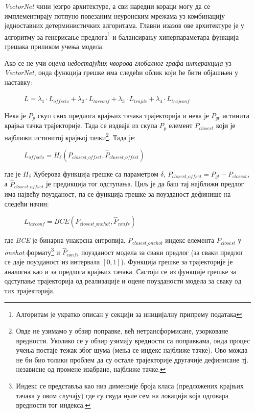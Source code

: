 \documentclass[11pt,oneside]{memoir}
\begin{document}
\textit{VectorNet} чини језгро архитектуре, а сви наредни кораци могу да се имплементирају потпуно повезаним неуронским мрежама уз комбинацију
једноставних детерминистичких алгоритама. Главни изазов ове архитектуре је у алгоритму за генерисање 
предлога\footnote{Алгоритам је укратко описан у секцији за иницијалну припрему података} и балансирању
хиперпараметара функција грешака приликом учења модела.

Ако се не учи \textit{оцена недостајућих чворова глобалног графа интеракција} уз \textit{VectorNet},
онда функција грешке има следећи облик који ће бити објашњен у наставку:

\begin{figure}[H]
  \centering
  $L = \lambda_{1} \cdot L_{offsets} + \lambda_{2} \cdot L_{tarconf} + \lambda_{3} \cdot L_{trajde} + \lambda_{4} \cdot L_{trajconf}$
\end{figure}

Нека је $P_{p}$ скуп свих предлога крајњих тачака трајекторија и нека је $P_{gt}$ истинита крајња тачка трајекторије. Тада се издваја
из скупа $P_{p}$ елемент $P_{closest}$ који је најближи истинитој крајњој тачки\footnote{Овде не узимамо у обзир поправке,
већ нетрансформисане, узорковане вредности. 
Уколико се у обзир узимају вредности са поправкама, онда процес учења постаје тежак због шума (мења се индекс најближе тачке). Ово можда не би био
толики проблем да су остале трајекторије другачије дефинисане тј. независне од промене изабране, најближе тачке.}. 
Тада је:

\begin{figure}[H]
  \centering
  $L_{offsets} = H_{\delta}(P_{closest\_offset}, \hat{P}_{closest\_offset})$
\end{figure}

\noindent где је $H_{\delta}$ Хуберова функција грешке са параметром $\delta$, $P_{closest\_offset} = P_{gt} - P_{closest}$,
а $\hat{P}_{closest\_offset}$ је предикција тог одступања. Циљ је да баш тај најближи предлог има највећу поузданост, па се функција грешке за 
поузданост дефинише на следећи начин:

\begin{figure}[H]
  \centering
  $L_{tarconf} = BCE(P_{closest\_onehot}, \hat{P}_{confs})$
\end{figure}

\noindent где \textit{BCE} је бинарна унакрсна ентропија, $P_{closest\_onehot}$ индекс елемента $P_{closest}$ у \textit{onehot} 
формату\footnote{Индекс се представља као низ димензије броја класа (предложених крајњих тачака у овом случају) где су свуда нуле сем на локацији која одговара
вредности тог индекса.} и $\hat{P}_{confs}$ поузданост модела за сваки предлог (за сваки предлог се даје поузданост из интервала $[0, 1]$). Функција грешке за
трајекторије је аналогна као и за предлога крајњих тачака. Састоји се из функције грешке за одступање трајекторија од реализације и оцене
поузданости модела за сваку од тих трајекторија.
\end{document}
